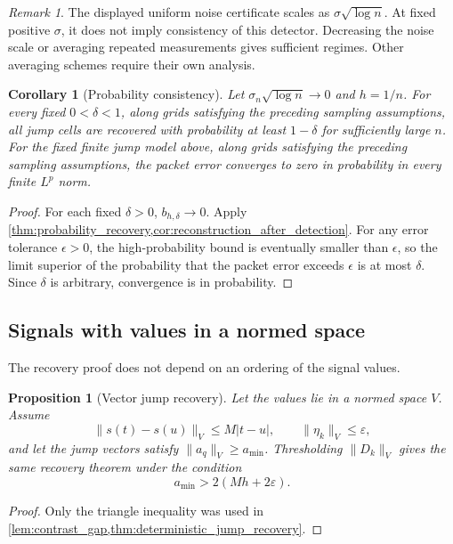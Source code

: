 \documentclass[11pt,letterpaper]{article}
\theoremstyle{plain}
\newtheorem{proposition}[proposition]{Proposition}
\theoremstyle{plain}
\theoremstyle{plain}
\newtheorem{corollary}[corollary]{Corollary}
\theoremstyle{definition}
\theoremstyle{definition}
\theoremstyle{definition}
\theoremstyle{definition}
\theoremstyle{remark}
\newtheorem{remark}[remark]{Remark}
\theoremstyle{remark}
\theoremstyle{remark}
\theoremstyle{remark}
\begin{document}
\begin{remark}\label{rem:noise_scaling}
The displayed uniform noise certificate scales as \(\sigma\sqrt{\log n}\). At fixed positive \(\sigma\), it does not imply consistency of this detector. Decreasing the noise scale or averaging repeated measurements gives sufficient regimes. Other averaging schemes require their own analysis.
\end{remark}

\begin{corollary}[Probability consistency]\label{cor:probability_consistency}
Let \(\sigma_n\sqrt{\log n}\to0\) and \(h=1/n\). For every fixed \(0<\delta<1\), along grids satisfying the preceding sampling assumptions, all jump cells are recovered with probability at least \(1-\delta\) for sufficiently large \(n\). For the fixed finite jump model above, along grids satisfying the preceding sampling assumptions, the packet error converges to zero in probability in every finite \(L^p\) norm.
\end{corollary}

\begin{proof}
For each fixed \(\delta>0\), \(b_{h,\delta}\to0\). Apply \cref{thm:probability_recovery,cor:reconstruction_after_detection}. For any error tolerance \(\epsilon>0\), the high-probability bound is eventually smaller than \(\epsilon\), so the limit superior of the probability that the packet error exceeds \(\epsilon\) is at most \(\delta\). Since \(\delta\) is arbitrary, convergence is in probability.
\end{proof}

\subsection{Signals with values in a normed space}

The recovery proof does not depend on an ordering of the signal values.

\begin{proposition}[Vector jump recovery]\label{prop:vector_jump_recovery}
Let the values lie in a normed space \(V\). Assume
\[
\|s(t)-s(u)\|_V\leq M|t-u|,
\qquad
\|\eta_k\|_V\leq\varepsilon,
\]
and let the jump vectors satisfy \(\|a_q\|_V\geq a_{\min}\). Thresholding \(\|D_k\|_V\) gives the same recovery theorem under the condition
\[
a_{\min}>2(Mh+2\varepsilon).
\]
\end{proposition}

\begin{proof}
Only the triangle inequality was used in \cref{lem:contrast_gap,thm:deterministic_jump_recovery}.
\end{proof}
\end{document}
